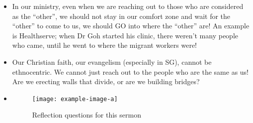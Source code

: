 \begin{itemize}
{  Corinthians 10:17, ``Because there is one bread, we who are many are one
  body, for we all partake of the one bread.''). }
  \item{In our ministry, even when we are reaching out to those who are
  considered as the ``other'', we should not stay in our comfort zone and
  wait for the ``other'' to come to us, we should GO into where the ``other''
  are! An example is Healthserve; when Dr Goh started his clinic, there
  weren't many people who came, until he went to where the migrant workers
  were!}
  \item{Our Christian faith, our evangelism (especially in SG), cannot be
  ethnocentric. We cannot just reach out to the people who are the same as
  us! Are we erecting walls that divide, or are we building bridges?}
  \item{\begin{figure}[H]
    \centering
    \texttt{[image: example-image-a]}
    \caption[]{Reflection questions for this sermon}
  \end{figure}}
\end{itemize}